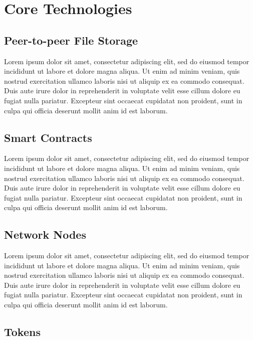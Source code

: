 \documentclass{article}
\newcommand\tab[1][1cm]{\hspace*{#1}}
\begin{document}

\section{Core Technologies}
\subsection{Peer-to-peer File Storage}

\tab Lorem ipsum dolor sit amet, consectetur adipiscing elit, sed do eiusmod tempor incididunt ut labore et dolore magna aliqua. Ut enim ad minim veniam, quis nostrud exercitation ullamco laboris nisi ut aliquip ex ea commodo consequat. Duis aute irure dolor in reprehenderit in voluptate velit esse cillum dolore eu fugiat nulla pariatur. Excepteur sint occaecat cupidatat non proident, sunt in culpa qui officia deserunt mollit anim id est laborum.

\subsection{Smart Contracts}

\tab Lorem ipsum dolor sit amet, consectetur adipiscing elit, sed do eiusmod tempor incididunt ut labore et dolore magna aliqua. Ut enim ad minim veniam, quis nostrud exercitation ullamco laboris nisi ut aliquip ex ea commodo consequat. Duis aute irure dolor in reprehenderit in voluptate velit esse cillum dolore eu fugiat nulla pariatur. Excepteur sint occaecat cupidatat non proident, sunt in culpa qui officia deserunt mollit anim id est laborum.

\subsection{Network Nodes}

\tab Lorem ipsum dolor sit amet, consectetur adipiscing elit, sed do eiusmod tempor incididunt ut labore et dolore magna aliqua. Ut enim ad minim veniam, quis nostrud exercitation ullamco laboris nisi ut aliquip ex ea commodo consequat. Duis aute irure dolor in reprehenderit in voluptate velit esse cillum dolore eu fugiat nulla pariatur. Excepteur sint occaecat cupidatat non proident, sunt in culpa qui officia deserunt mollit anim id est laborum.

\subsection{Tokens}
\end{document}
